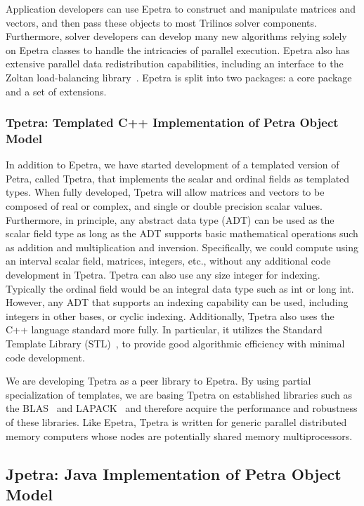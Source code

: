 \documentclass[12pt,relax]{TrilinosOverview}
\begin{document}
Application developers can use Epetra to construct and manipulate matrices
and vectors, and then pass these objects to most Trilinos solver components.
Furthermore, solver developers can develop many new algorithms relying 
solely on Epetra classes to handle the intricacies of parallel execution.  
Epetra also has extensive parallel data  redistribution capabilities, 
including an interface to the Zoltan load-balancing
library~\cite{zoltan-ug}.  Epetra is split into two packages:  a core
package and a set of extensions.

\subsubsection{Tpetra: Templated C++ Implementation of Petra Object Model}

In addition to Epetra, we have started development of a templated 
version of Petra, called Tpetra, that implements the scalar and 
ordinal fields as templated types.  When fully developed, Tpetra 
will allow matrices and vectors to be composed of real or complex, 
and single or double precision scalar values.  Furthermore, in 
principle, any abstract data type (ADT) can be used as the scalar 
field type as long as the ADT supports basic mathematical operations 
such as addition and multiplication and inversion. Specifically, we 
could compute using an interval scalar field, matrices, integers, etc., 
without any additional code development in Tpetra.  Tpetra can also 
use any size integer for indexing.  Typically the ordinal field would 
be an integral data type such as int or long int.  However, any ADT 
that supports an indexing capability can be used, including integers in 
other bases, or cyclic indexing. Additionally, Tpetra also uses the 
C++ language standard more fully.  In particular, it utilizes the 
Standard Template Library (STL)~\cite{Stroustrup}, to provide good 
algorithmic efficiency with minimal code development.

We are developing Tpetra as a peer library to Epetra. By using partial
specialization of templates, we are basing Tpetra on established libraries 
such as the BLAS~\cite{BLAS1,BLAS2,BLAS3} and LAPACK~\cite{lapack} and 
therefore acquire the performance and robustness of these libraries.
Like Epetra, Tpetra is written for generic parallel distributed
memory computers whose nodes are
potentially shared memory multiprocessors.

\subsection{Jpetra: Java Implementation of Petra Object Model}
\end{document}
